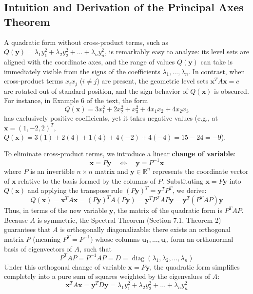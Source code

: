 \documentclass[11pt, letterpaper]{article}
\theoremstyle{definition}
\theoremstyle{remark}
\begin{document}
\subsection{Intuition and Derivation of the Principal Axes Theorem}
A quadratic form without cross-product terms, such as $Q(\mathbf{y}) = \lambda_1 y_1^2 + \lambda_2 y_2^2 + \dots + \lambda_n y_n^2$, is remarkably easy to analyze: its level sets are aligned with the coordinate axes, and the range of values $Q(\mathbf{y})$ can take is immediately visible from the signs of the coefficients $\lambda_1, \dots, \lambda_n$. In contrast, when cross-product terms $x_i x_j$ ($i \neq j$) are present, the geometric level sets $\mathbf{x}^T A \mathbf{x} = c$ are rotated out of standard position, and the sign behavior of $Q(\mathbf{x})$ is obscured. For instance, in Example 6 of the text, the form
\[
Q(\mathbf{x}) = 3x_1^2 + 2x_2^2 + x_3^2 + 4x_1x_2 + 4x_2x_3
\]
has exclusively positive coefficients, yet it takes negative values (e.g., at $\mathbf{x} = (1, -2, 2)^T$, $Q(\mathbf{x}) = 3(1) + 2(4) + 1(4) + 4(-2) + 4(-4) = 15 - 24 = -9$).

To eliminate cross-product terms, we introduce a linear \textbf{change of variable}:
\[
\mathbf{x} = P\mathbf{y} \quad \Longleftrightarrow \quad \mathbf{y} = P^{-1}\mathbf{x}
\]
where $P$ is an invertible $n \times n$ matrix and $\mathbf{y} \in \mathbb{R}^n$ represents the coordinate vector of $\mathbf{x}$ relative to the basis formed by the columns of $P$. Substituting $\mathbf{x} = P\mathbf{y}$ into $Q(\mathbf{x})$ and applying the transpose rule $(P\mathbf{y})^T = \mathbf{y}^T P^T$, we derive:
\[
Q(\mathbf{x}) = \mathbf{x}^T A \mathbf{x} = (P\mathbf{y})^T A (P\mathbf{y}) = \mathbf{y}^T P^T A P \mathbf{y} = \mathbf{y}^T (P^T A P) \mathbf{y}
\]
Thus, in terms of the new variable $\mathbf{y}$, the matrix of the quadratic form is $P^T A P$. Because $A$ is symmetric, the Spectral Theorem (Section 7.1, Theorem 2) guarantees that $A$ is orthogonally diagonalizable: there exists an orthogonal matrix $P$ (meaning $P^T = P^{-1}$) whose columns $\mathbf{u}_1, \dots, \mathbf{u}_n$ form an orthonormal basis of eigenvectors of $A$, such that
\[
P^T A P = P^{-1} A P = D = \operatorname{diag}(\lambda_1, \lambda_2, \dots, \lambda_n)
\]
Under this orthogonal change of variable $\mathbf{x} = P\mathbf{y}$, the quadratic form simplifies completely into a pure sum of squares weighted by the eigenvalues of $A$:
\[
\mathbf{x}^T A \mathbf{x} = \mathbf{y}^T D \mathbf{y} = \lambda_1 y_1^2 + \lambda_2 y_2^2 + \dots + \lambda_n y_n^2
\]
\end{document}
